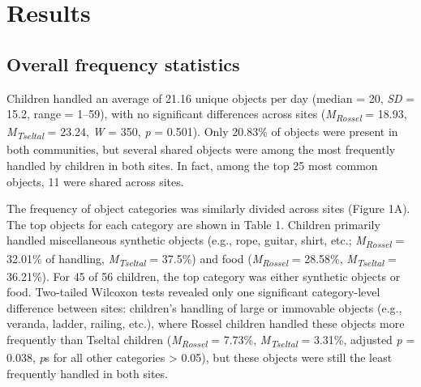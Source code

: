 \documentclass[10pt, letterpaper]{article}
\begin{document}
\begin{table}[!ht]
\centering
{}
\caption{Objects handled by the most children across categories and sites.} 
\label{tab:top-objects}
\end{table}

\hypertarget{results}{%
\section{Results}\label{results}}

\hypertarget{overall-frequency-statistics}{%
\subsection{Overall frequency
statistics}\label{overall-frequency-statistics}}

Children handled an average of 21.16 unique objects per day (median =
20, \emph{SD} = 15.2, range = 1--59), with no significant differences
across sites (\emph{M}\textsubscript{\emph{Rossel}} = 18.93,
\emph{M}\textsubscript{\emph{Tseltal}} = 23.24, \emph{W} = 350, \emph{p}
= 0.501). Only 20.83\% of objects were present in both communities, but
several shared objects were among the most frequently handled by
children in both sites. In fact, among the top 25 most common objects,
11 were shared across sites.

The frequency of object categories was similarly divided across sites
(Figure 1A). The top objects for each category are shown in Table 1.
Children primarily handled miscellaneous synthetic objects (e.g., rope,
guitar, shirt, etc.; \emph{M}\textsubscript{\emph{Rossel}} = 32.01\% of
handling, \emph{M}\textsubscript{\emph{Tseltal}} = 37.5\%) and food
(\emph{M}\textsubscript{\emph{Rossel}} = 28.58\%,
\emph{M}\textsubscript{\emph{Tseltal}} = 36.21\%). For 45 of 56
children, the top category was either synthetic objects or food.
Two-tailed Wilcoxon tests revealed only one significant category-level
difference between sites: children's handling of large or immovable
objects (e.g., veranda, ladder, railing, etc.), where Rossel children
handled these objects more frequently than Tseltal children
(\emph{M}\textsubscript{\emph{Rossel}} = 7.73\%,
\emph{M}\textsubscript{\emph{Tseltal}} = 3.31\%, adjusted \emph{p} =
0.038, \emph{p}s for all other categories \textgreater{} 0.05), but
these objects were still the least frequently handled in both sites.
\end{document}
